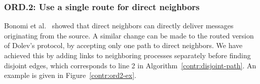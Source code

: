 
\subsubsection{ORD.2: Use a single route for direct neighbors}
Bonomi et al.~\cite{bonomi2019multihop} showed that direct neighbors can directly deliver messages originating from the source. A similar change can be made to the routed version of Dolev's protocol, by accepting only one path to direct neighbors. We have achieved this by adding links to neighboring processes separately before finding disjoint edges, which corresponds to line 2 in Algorithm~\ref{contr:disjoint-path}. An example is given in Figure~\ref{contr:ord2-ex}.


